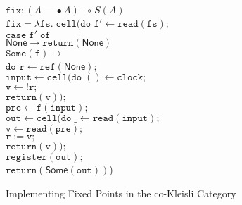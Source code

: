 \documentclass[preprint]{sigplanconf}
\newcommand{\term}[1]{\ensuremath{\mathtt{{#1}}}}
\newcommand{\lolli}{\multimap}
\newcommand{\lollishrink}{-\!\!\!\,\bullet}
\newcommand{\None}{\mathsf{None}}
\newcommand{\Some}[1]{\mathsf{Some}({#1})}
\begin{document}
\begin{figure}
\begin{tabbing}
$\term{fix} : (A \lollishrink A) \lolli S(A)$ \\
\term{fix = \lambda fs.\;cell(do}
  \=\term{f' \leftarrow read(fs);} \\
  \>\term{case\;f'\;of}\\
  \>\;\;\=\term{\None \to return(\None)}\\
  \>    \>\term{Some(f) \to} \\
  \>    \>\;\;\term{do} \=\term{r \leftarrow ref(\None);}\\
  \>    \>  \>\term{input \leftarrow cell(do\;}\=\term{() \leftarrow clock;}\\
  \>    \>  \>                                 \>\term{v \leftarrow !r;}\\
  \>    \>  \>                                 \>\term{return(v));}\\
  \>    \>  \>\term{pre \leftarrow f(input);}\\
  \>    \>  \>\term{out \leftarrow cell(do\;}\=\term{\_ \leftarrow read(input);} \\
  \>    \>  \>                               \>\term{v \leftarrow read(pre);}\\
  \>    \>  \>                               \>\term{r := v;}\\
  \>    \>  \>                               \>\term{return(v));}\\
  \>    \>  \>\term{register(out);}\\
  \>    \>  \>\term{return(\Some{out})})\\
\end{tabbing}
\caption{Implementing Fixed Points in the co-Kleisli Category}  
\label{cokleisli-implementation-2}
\end{figure}
\end{document}
